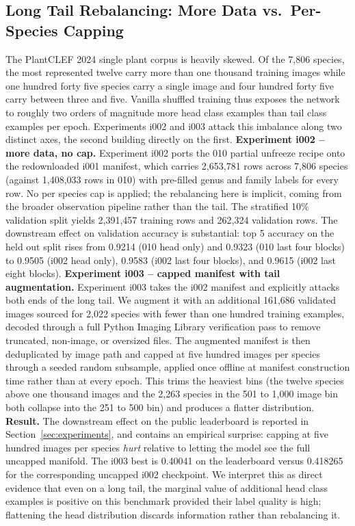 \documentclass[sigconf]{ceurart}
\begin{document}
\subsection{Long Tail Rebalancing: More Data vs.\ Per-Species Capping}
\label{sec:cap_extra}
The PlantCLEF 2024 single plant corpus is heavily skewed. Of the 7,806 species, the most represented twelve carry more than one thousand training images while one hundred forty five species carry a single image and four hundred forty five carry between three and five. Vanilla shuffled training thus exposes the network to roughly two orders of magnitude more head class examples than tail class examples per epoch. Experiments i002 and i003 attack this imbalance along two distinct axes, the second building directly on the first.
\textbf{Experiment i002 -- more data, no cap.} Experiment i002 ports the 010 partial unfreeze recipe onto the redownloaded i001 manifest, which carries 2,653,781 rows across 7,806 species (against 1,408,033 rows in 010) with pre-filled genus and family labels for every row. No per species cap is applied; the rebalancing here is implicit, coming from the broader observation pipeline rather than the tail. The stratified 10\% validation split yields 2,391,457 training rows and 262,324 validation rows. The downstream effect on validation accuracy is substantial: top 5 accuracy on the held out split rises from 0.9214 (010 head only) and 0.9323 (010 last four blocks) to 0.9505 (i002 head only), 0.9583 (i002 last four blocks), and 0.9615 (i002 last eight blocks).
\textbf{Experiment i003 -- capped manifest with tail augmentation.} Experiment i003 takes the i002 manifest and explicitly attacks both ends of the long tail. We augment it with an additional 161,686 validated images sourced for 2,022 species with fewer than one hundred training examples, decoded through a full Python Imaging Library verification pass to remove truncated, non-image, or oversized files. The augmented manifest is then deduplicated by image path and capped at five hundred images per species through a seeded random subsample, applied once offline at manifest construction time rather than at every epoch. This trims the heaviest bins (the twelve species above one thousand images and the 2,263 species in the 501 to 1,000 image bin both collapse into the 251 to 500 bin) and produces a flatter distribution.
\textbf{Result.} The downstream effect on the public leaderboard is reported in Section~\ref{sec:experiments}, and contains an empirical surprise: capping at five hundred images per species \emph{hurt} relative to letting the model see the full uncapped manifold. The i003 best is 0.40041 on the leaderboard versus 0.418265 for the corresponding uncapped i002 checkpoint. We interpret this as direct evidence that even on a long tail, the marginal value of additional head class examples is positive on this benchmark provided their label quality is high; flattening the head distribution discards information rather than rebalancing it.
\end{document}
